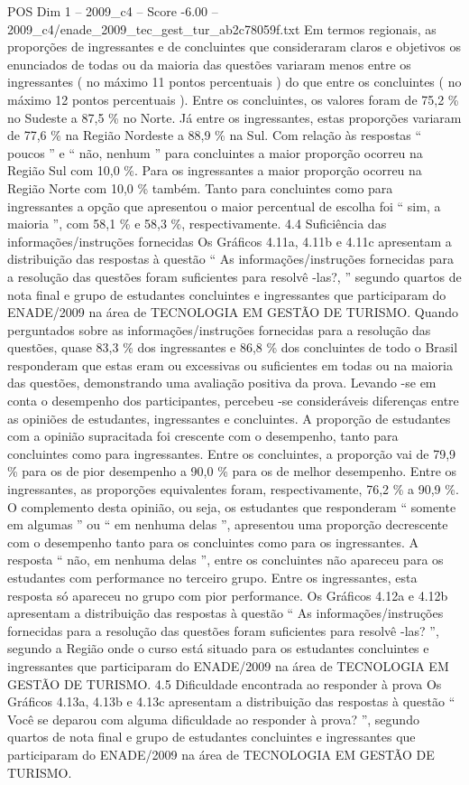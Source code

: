 \begin{textsample}{POS Dim 1 – 2009\_c4 – Score -6.00 – 2009\_c4/enade\_2009\_tec\_gest\_tur\_ab2c78059f.txt}
Em termos regionais, as proporções de ingressantes e de concluintes que consideraram claros e objetivos os enunciados de todas ou da maioria das questões variaram menos entre os ingressantes ( no máximo 11 pontos percentuais ) do que entre os concluintes ( no máximo 12 pontos percentuais ).
Entre os concluintes, os valores foram de 75,2 \% no Sudeste a 87,5 \% no Norte.
Já entre os ingressantes, estas proporções variaram de 77,6 \% na Região Nordeste a 88,9 \% na Sul.
Com relação às respostas “ poucos ” e “ não, nenhum ” para concluintes a maior proporção ocorreu na Região Sul com 10,0 \%.
Para os ingressantes a maior proporção ocorreu na Região Norte com 10,0 \% também.
Tanto para concluintes como para ingressantes a opção que apresentou o maior percentual de escolha foi “ sim, a maioria ”, com 58,1 \% e 58,3 \%, respectivamente. 4.4 Suficiência das informações/instruções fornecidas Os Gráficos 4.11a, 4.11b e 4.11c apresentam a distribuição das respostas à questão “ As informações/instruções fornecidas para a resolução das questões foram suficientes para resolvê -las?, ” segundo quartos de nota final e grupo de estudantes concluintes e ingressantes que participaram do ENADE/2009 na área de TECNOLOGIA EM GESTÃO DE TURISMO.
Quando perguntados sobre as informações/instruções fornecidas para a resolução das questões, quase 83,3 \% dos ingressantes e 86,8 \% dos concluintes de todo o Brasil responderam que estas eram ou excessivas ou suficientes em todas ou na maioria das questões, demonstrando uma avaliação positiva da prova.
Levando -se em conta o desempenho dos participantes, percebeu -se consideráveis diferenças entre as opiniões de estudantes, ingressantes e concluintes.
A proporção de estudantes com a opinião supracitada foi crescente com o desempenho, tanto para concluintes como para ingressantes.
Entre os concluintes, a proporção vai de 79,9 \% para os de pior desempenho a 90,0 \% para os de melhor desempenho.
Entre os ingressantes, as proporções equivalentes foram, respectivamente, 76,2 \% a 90,9 \%.
O complemento desta opinião, ou seja, os estudantes que responderam “ somente em algumas ” ou “ em nenhuma delas ”, apresentou uma proporção decrescente com o desempenho tanto para os concluintes como para os ingressantes.
A resposta “ não, em nenhuma delas ”, entre os concluintes não apareceu para os estudantes com performance no terceiro grupo.
Entre os ingressantes, esta resposta só apareceu no grupo com pior performance.
Os Gráficos 4.12a e 4.12b apresentam a distribuição das respostas à questão “ As informações/instruções fornecidas para a resolução das questões foram suficientes para resolvê -las? ”, segundo a Região onde o curso está situado para os estudantes concluintes e ingressantes que participaram do ENADE/2009 na área de TECNOLOGIA EM GESTÃO DE TURISMO. 4.5 Dificuldade encontrada ao responder à prova Os Gráficos 4.13a, 4.13b e 4.13c apresentam a distribuição das respostas à questão “ Você se deparou com alguma dificuldade ao responder à prova? ”, segundo quartos de nota final e grupo de estudantes concluintes e ingressantes que participaram do ENADE/2009 na área de TECNOLOGIA EM GESTÃO DE TURISMO.

\end{textsample}
